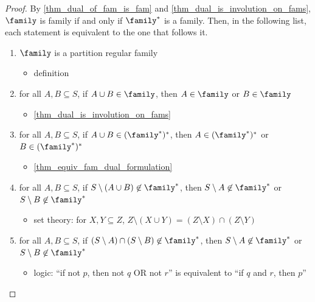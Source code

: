 \begin{proof}
    By \cref{thm_dual_of_fam_is_fam} and \cref{thm_dual_is_involution_on_fams}, $\family$ is family if and only if $\family^*$ is a family.  Then, in the following list, each statement is equivalent to the one that follows it.
    \begin{enumerate}
        \item $\family$ is a partition regular family
        \begin{itemize}
            \item[--] definition
        \end{itemize}

        \item for all $A, B \subseteq S$, if $A \cup B \in \family$, then $A \in \family$ or $B \in \family$
        \begin{itemize}
            \item[--] \cref{thm_dual_is_involution_on_fams}
        \end{itemize}

        \item for all $A, B \subseteq S$, if $A \cup B \in (\family^*)^*$, then $A \in (\family^*)^*$ or $B \in (\family^*)^*$
        \begin{itemize}
            \item[--] \cref{thm_equiv_fam_dual_formulation}
        \end{itemize}

        \item for all $A, B \subseteq S$, if $S \setminus (A \cup B) \not\in \family^*$, then $S \setminus A \not\in \family^*$ or $S \setminus B \not\in \family^*$
        \begin{itemize}
            \item[--] set theory: for $X, Y \subseteq Z$, $Z \setminus (X \cup Y) = (Z \setminus X) \cap (Z \setminus Y)$
        \end{itemize}

        \item for all $A, B \subseteq S$, if $(S \setminus A) \cap (S \setminus B) \not\in \family^*$, then $S \setminus A \not\in \family^*$ or $S \setminus B \not\in \family^*$
        \begin{itemize}
            \item[--] logic: ``if not $p$, then not $q$ OR not $r$'' is equivalent to ``if $q$ and $r$, then $p$''
        \end{itemize}


\end{enumerate}
\end{proof}
